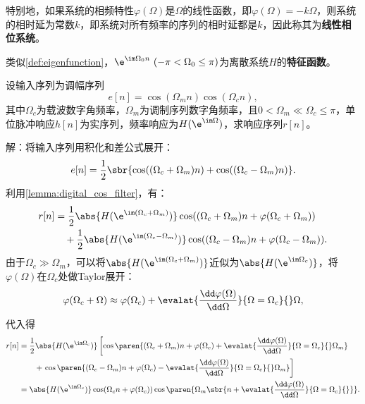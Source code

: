 特别地，如果系统的相频特性$\varphi(\Omega)$是$\Omega$的线性函数，即$\varphi(\Omega)=-k\Omega$，则系统的相时延为常数$k$，即系统对所有频率的序列的相时延都是$k$，因此称其为\textbf{线性相位系统}。

类似\cref{def:eigenfunction}，$\e^{\im\Omega_0 n}\ (-\pi<\Omega_0\leq\pi)$为离散系统$H$的\textbf{特征函数}。

\begin{example}[群时延]
    设输入序列为调幅序列
    \begin{equation}
        e[n]=\cos(\Omega_m n)\cos(\Omega_c n),
    \end{equation}
    其中$\Omega_c$为载波数字角频率，$\Omega_m$为调制序列数字角频率，且$0<\Omega_m\ll\Omega_c\leq\pi$，单位脉冲响应$h[n]$为实序列，频率响应为$H(\e^{\im\Omega})$，求响应序列$r[n]$。

    解：将输入序列用积化和差公式展开：
    \begin{equation}
        e[n]=\frac{1}{2}\sbr{\cos((\Omega_c+\Omega_m)n)+\cos((\Omega_c-\Omega_m)n)}.
    \end{equation}
    利用\cref{lemma:digital_cos_filter}，有：
    \begin{align}
        r[n]&=\frac{1}{2}\abs{H(\e^{\im(\Omega_c+\Omega_m)})}\cos((\Omega_c+\Omega_m)n+\varphi(\Omega_c+\Omega_m)) \nonumber \\
        &\quad+\frac{1}{2}\abs{H(\e^{\im(\Omega_c-\Omega_m)})}\cos((\Omega_c-\Omega_m)n+\varphi(\Omega_c-\Omega_m)).
    \end{align}
    由于$\Omega_c\gg\Omega_m$，可以将$\abs{H(\e^{\im(\Omega_c+\Omega_m)})}$近似为$\abs{H(\e^{\im\Omega_c})}$，将$\varphi(\Omega)$在$\Omega_c$处做Taylor展开：
    \begin{equation}
        \varphi(\Omega_c+\Omega)\approx\varphi(\Omega_c)+\evalat{\frac{\dd\varphi(\Omega)}{\dd\Omega}}{\Omega=\Omega_c}{}\Omega,
    \end{equation}
    代入得
    \begin{align}
        r[n]&=\frac{1}{2}\abs{H(\e^{\im\Omega_c})}\left[\cos\paren{(\Omega_c+\Omega_m)n+\varphi(\Omega_c)+\evalat{\frac{\dd\varphi(\Omega)}{\dd\Omega}}{\Omega=\Omega_c}{}\Omega_m}\right. \nonumber \\
        &\qquad+\left.\cos\paren{(\Omega_c-\Omega_m)n+\varphi(\Omega_c)-\evalat{\frac{\dd\varphi(\Omega)}{\dd\Omega}}{\Omega=\Omega_c}{}\Omega_m}\right] \nonumber \\
        &=\abs{H(\e^{\im\Omega_c})}\cos(\Omega_c n+\varphi(\Omega_c))\cos\paren{\Omega_m\sbr{n+\evalat{\frac{\dd\varphi(\Omega)}{\dd\Omega}}{\Omega=\Omega_c}{}}}.

\end{align}
\end{example}
